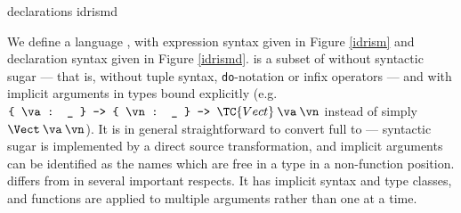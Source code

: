 {\IdrisM{} declarations}
{idrismd}

We define a language \IdrisM{}, with expression syntax given in Figure \ref{idrism}
and declaration syntax given in Figure \ref{idrismd}.
\IdrisM{} is a subset of \Idris{} without syntactic sugar --- that is, without
tuple syntax, \texttt{do}-notation or infix operators --- and with implicit
arguments in types bound explicitly 
(e.g. $\piimp{\va}{\_}\piimp{\vn}{\_}\TC{Vect}\:\va\:\vn$
instead of simply $\Vect\:\va\:\vn$).
It is in general straightforward to
convert full \Idris{} to \IdrisM{} --- syntactic sugar is implemented by a
direct source transformation, and implicit arguments can be identified as the names
which are free in a type in a non-function position.
%
\IdrisM{} differs from \TT{} in several important respects. It has implicit
syntax and type classes, and functions are applied to multiple arguments rather
than one at a time. 

